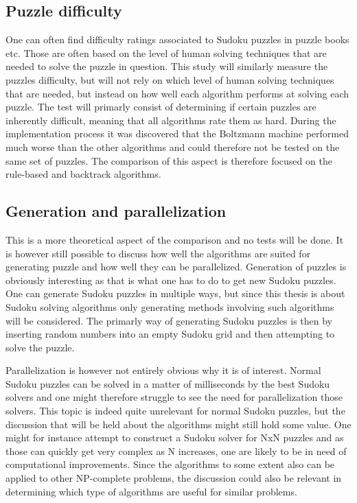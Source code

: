 \documentclass[a4paper,11pt]{kth-mag}
\begin{document}
\FloatBarrier
\subsection{Puzzle difficulty}
\label{sec:puzzleDifficulty}
One can often find difficulty ratings associated to Sudoku puzzles in puzzle books etc. 
Those are often based on the level of human solving techniques that are needed to solve the puzzle in question.\cite{difficulty} 
This study will similarly measure the puzzles difficulty, but will not rely on which level of human solving techniques that are needed, but instead on how well each algorithm performs at solving each puzzle. 
The test will primarly consist of determining if certain puzzles are inherently difficult, meaning that all algorithms rate them as hard.
During the implementation process it was discovered that the Boltzmann machine performed much worse than the other algorithms and could therefore not be tested on the same set of puzzles.
The comparison of this aspect is therefore focused on the rule-based and backtrack algorithms.

\FloatBarrier
\subsection{Generation and parallelization}
This is a more theoretical aspect of the comparison and no tests will be done.
It is however still possible to discuss how well the algorithms are suited for generating puzzle and how well they can be parallelized. 
Generation of puzzles is obviously interesting as that is what one has to do to get new Sudoku puzzles.
One can generate Sudoku puzzles in multiple ways, but since this thesis is about Sudoku solving algorithms only generating methods involving such algorithms will be considered.
The primarly way of generating Sudoku puzzles is then by inserting random numbers into an empty Sudoku grid and then attempting to solve the puzzle.

Parallelization is however not entirely obvious why it is of interest. 
Normal Sudoku puzzles can be solved in a matter of milliseconds by the best Sudoku solvers and one might therefore struggle to see the need for parallelization those solvers. 
This topic is indeed quite unrelevant for normal Sudoku puzzles, but the discussion that will be held about the algorithms might still hold some value.
One might for instance attempt to construct a Sudoku solver for NxN puzzles and as those can quickly get very complex as N increases, one are likely to be in need of computational improvements.  
Since the algorithms to some extent also can be applied to other NP-complete problems, the discussion could also be relevant in determining which type of algorithms are useful for similar problems. 
\end{document}
